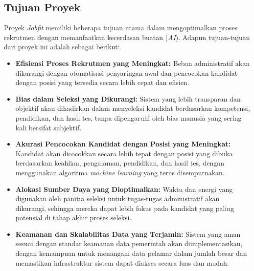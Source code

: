 \documentclass[journal,article,submit,pdftex,moreauthors]{Definitions/mdpi}
\begin{document}
\subsection{Tujuan Proyek}
Proyek \textit{Jobfit} memiliki beberapa tujuan utama dalam mengoptimalkan proses rekrutmen dengan memanfaatkan kecerdasan buatan (\textit{AI}). Adapun tujuan-tujuan dari proyek ini adalah sebagai berikut:
\begin{itemize}[left=2em]
    \item \textbf{Efisiensi Proses Rekrutmen yang Meningkat:} Beban administratif akan dikurangi dengan otomatisasi penyaringan awal dan pencocokan kandidat dengan posisi yang tersedia secara lebih cepat dan efisien.
    \item \textbf{Bias dalam Seleksi yang Dikurangi:} Sistem yang lebih transparan dan objektif akan dihadirkan dalam menyeleksi kandidat berdasarkan kompetensi, pendidikan, dan hasil tes, tanpa dipengaruhi oleh bias manusia yang sering kali bersifat subjektif.
    \item \textbf{Akurasi Pencocokan Kandidat dengan Posisi yang Meningkat:} Kandidat akan dicocokkan secara lebih tepat dengan posisi yang dibuka berdasarkan keahlian, pengalaman, pendidikan, dan hasil tes, dengan menggunakan algoritma \textit{machine learning} yang terus disempurnakan.
    \item \textbf{Alokasi Sumber Daya yang Dioptimalkan:} Waktu dan energi yang digunakan oleh panitia seleksi untuk tugas-tugas administratif akan dikurangi, sehingga mereka dapat lebih fokus pada kandidat yang paling potensial di tahap akhir proses seleksi.
    \item \textbf{Keamanan dan Skalabilitas Data yang Terjamin:} Sistem yang aman sesuai dengan standar keamanan data pemerintah akan diimplementasikan, dengan kemampuan untuk menangani data pelamar dalam jumlah besar dan memastikan infrastruktur sistem dapat diakses secara luas dan mudah.
\end{itemize}
\end{document}
